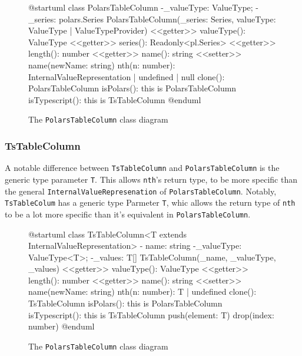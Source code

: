 \begin{figure}
	\begin{plantuml}
		@startuml
		class PolarsTableColumn {
				-_valueType: ValueType;
				-_series: polars.Series
				PolarsTableColumn(_series: Series, valueType: ValueType | ValueTypeProvider)
				<<getter>> valueType(): ValueType
				<<getter>> series(): Readonly<pl.Series>
				<<getter>> length(): number
				<<getter>> name(): string
				<<setter>> name(newName: string)
				nth(n: number): InternalValueRepresentation | undefined | null
				clone(): PolarsTableColumn
				isPolars(): this is PolarsTableColumn
				isTypescript(): this is TsTableColumn
			}
		@enduml
	\end{plantuml}
	\caption{The \Verb|PolarsTableColumn| class diagram}
	\label{fig:uml:polastablecolumn}
\end{figure}

\subsubsection{TsTableColumn}
A notable difference between \Verb|TsTableColumn| and \Verb|PolarsTableColumn| is the generic type parameter \Verb|T|.
This allows \Verb|nth|'s return type, to be more specific than the general \Verb|InternalValueRepresenation| of \Verb|PolarsTableColumn|.
Notably, \Verb|TsTableColum| has a generic type Parmeter \Verb|T|, whic allows the return type of \Verb|nth| to be a lot more specific than it's equivalent in \Verb|PolarsTableColumn|.

\begin{figure}
	\begin{plantuml}
		@startuml
		class TsTableColumn<T extends InternalValueRepresentation> {
				- name: string
				-_valueType: ValueType<T>;
				-_values: T[]
				TsTableColumn(_name, _valueType, _values)
				<<getter>> valueType(): ValueType
				<<getter>> length(): number
				<<getter>> name(): string
				<<setter>> name(newName: string)
				nth(n: number): T | undefined
				clone(): TsTableColumn
				isPolars(): this is PolarsTableColumn
				isTypescript(): this is TsTableColumn
				push(element: T)
				drop(index: number)
			}
		@enduml
	\end{plantuml}
	\caption{The \Verb|PolarsTableColumn| class diagram}
	\label{fig:uml:tstablecolumn}
\end{figure}



